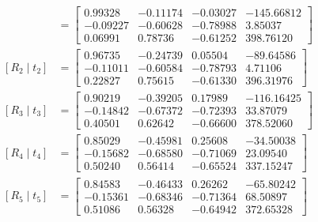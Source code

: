 \begin{align*}
[R_{1}\mid t_{1}] &= \begin{bmatrix}0.99328 & -0.11174 & -0.03027 & -145.66812 \\ -0.09227 & -0.60628 & -0.78988 & 3.85037 \\ 0.06991 & 0.78736 & -0.61252 & 398.76120\end{bmatrix} \\
[R_{2}\mid t_{2}] &= \begin{bmatrix}0.96735 & -0.24739 & 0.05504 & -89.64586 \\ -0.11011 & -0.60584 & -0.78793 & 4.71106 \\ 0.22827 & 0.75615 & -0.61330 & 396.31976\end{bmatrix} \\
[R_{3}\mid t_{3}] &= \begin{bmatrix}0.90219 & -0.39205 & 0.17989 & -116.16425 \\ -0.14842 & -0.67372 & -0.72393 & 33.87079 \\ 0.40501 & 0.62642 & -0.66600 & 378.52060\end{bmatrix} \\
[R_{4}\mid t_{4}] &= \begin{bmatrix}0.85029 & -0.45981 & 0.25608 & -34.50038 \\ -0.15682 & -0.68580 & -0.71069 & 23.09540 \\ 0.50240 & 0.56414 & -0.65524 & 337.15247\end{bmatrix} \\
[R_{5}\mid t_{5}] &= \begin{bmatrix}0.84583 & -0.46433 & 0.26262 & -65.80242 \\ -0.15361 & -0.68346 & -0.71364 & 68.50897 \\ 0.51086 & 0.56328 & -0.64942 & 372.65328\end{bmatrix} \\
\end{align*}